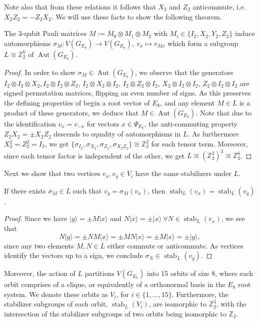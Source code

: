 Note also that from these relations it follows that $X_2$ and $Z_2$ anticommute, i.e. $X_2 Z_2 = -Z_2 X_2$.
We will use these facts to show the following theorem.
\begin{theorem}
    The 3-qubit Pauli matrices $M := M_0 \otimes M_1 \otimes M_2$ with $M_i \in \{I_2,X_2,Y_2,Z_2\}$ induce automorphisms
    $\sigma_M : V(G_{E_8}) \rightarrow V(G_{E_8}),~v_x \mapsto v_{Mx}$
    which form a subgroup $L \cong \mathbb{Z}_2^6$ of $\operatorname{Aut}(G_{E_8})$.
\end{theorem}
\begin{proof}
    In order to show $\sigma_M \in \operatorname{Aut}(G_{E_8})$, we observe that
    the generators $I_2\otimes I_2 \otimes X_2, I_2\otimes I_2 \otimes Z_2$,
    $I_2\otimes X_2 \otimes I_2$, $I_2\otimes Z_2 \otimes I_2$, $X_2\otimes I_2 \otimes I_2$, $Z_2\otimes I_2 \otimes I_2$
    are signed permutation matrices, flipping an even number of signs.
    As this preserves the defining properties of begin a root vector of $E_8$, 
    and any element $M \in L$ is a product of these generators, we deduce 
    that $M \in \operatorname{Aut}(G_{E_8})$.
    Note that due to the identification $v_x = v_{-x}$ for vectors $x \in \Psi_{E_8}$,
    the anti-commuting property $Z_2 X_2 = \pm X_2 Z_2$ descends to equality of automorphisms in $L$.
    As furthermore $X_2^2 = Z_2^2 = I_2$, we get $\{ \sigma_{I_2}, \sigma_{X_2}, \sigma_{Z_2}, \sigma_{X_2 Z_2} \} \cong \mathbb{Z}_2^2$ for each tensor term.
    Moreover, since each tensor factor is independent of the other, we get $L \cong (\mathbb{Z}_2^2)^3 \cong \mathbb{Z}_2^6$.
\end{proof}
Next we show that two vertices $v_x, v_{y} \in V_i$ have the same stabilizers under $L$.
\begin{lemma}
    If there exists $\sigma_M \in L$ such that $v_y = \sigma_M(v_x)$, 
    then $\operatorname{stab}_L(v_x) = \operatorname{stab}_L(v_y)$.
\end{lemma}
\begin{proof}
    Since we have $|y\rangle = \pm M|x\rangle$ and $N|x\rangle = \pm |x\rangle~\forall N \in \operatorname{stab}_L(v_x)$,
    we see that 
    \[ N|y\rangle = \pm NM|x\rangle = \pm MN|x\rangle = \pm M|x\rangle = \pm |y\rangle, \]
    since any two elements $M, N \in L$ either commute or anticommute.
    As vertices identify the vectors up to a sign, we conclude $\sigma_N \in \operatorname{stab}_L(v_y)$.
\end{proof}
Moreover, the action of $L$ partitions $V(G_{E_8})$
into 15 orbits of size 8, where each orbit comprises of a clique, 
or equivalently of a orthonormal basis in the $E_8$ root system.
We denote these orbits as $V_i$, for $i \in \{1,\dots, 15 \}$.
Furthermore, the stabilizer subgroups of each orbit, $\operatorname{stab}_L(V_i)$,
are isomorphic to $\mathbb{Z}_2^3$, with the intersection
of the stabilizer subgroups of two orbits being isomorphic to $\mathbb{Z}_2$.

